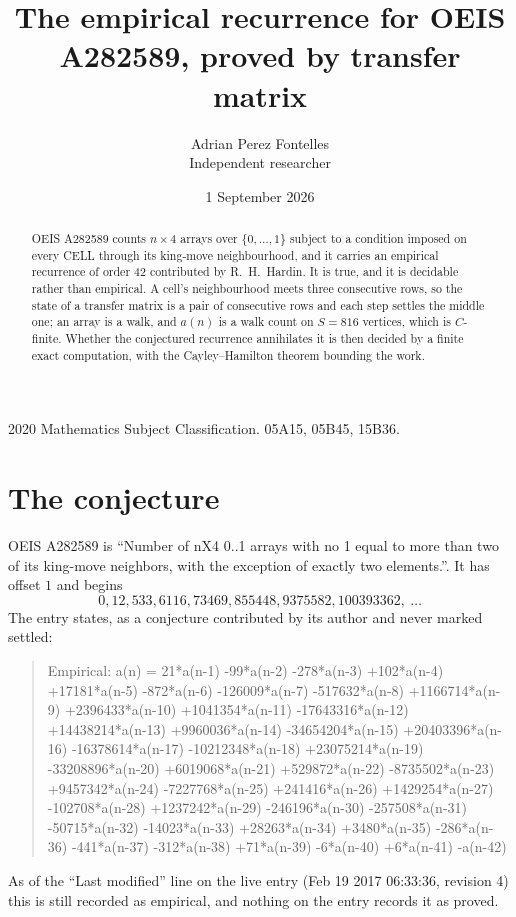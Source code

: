 \documentclass[11pt,a4paper]{article}
\title{The empirical recurrence for OEIS A282589, proved by transfer matrix}
\author{Adrian Perez Fontelles\\ \small Independent researcher}
\date{1 September 2026}
\theoremstyle{plain}
\theoremstyle{definition}
\begin{document}
\maketitle

\begin{abstract}
OEIS A282589 counts $n\times4$ arrays over $\{0,\dots,1\}$ subject to a condition imposed on
every CELL through its king-move neighbourhood, and it carries an empirical recurrence of
order $42$ contributed by R.~H.~Hardin. It is true, and it is decidable rather than
empirical. A cell's neighbourhood meets three consecutive rows, so the state of a transfer
matrix is a pair of consecutive rows and each step settles the middle one; an array is a
walk, and $a(n)$ is a walk count on $S=816$ vertices, which is $C$-finite. Whether the
conjectured recurrence annihilates it is then decided by a finite exact computation, with the
Cayley--Hamilton theorem bounding the work.
\end{abstract}

\noindent\small 2020 Mathematics Subject Classification. 05A15, 05B45, 15B36.\normalsize

\section{The conjecture}

OEIS A282589 is ``Number of nX4 0..1 arrays with no 1 equal to more than two of its king-move neighbors, with the exception of exactly two elements.''. It has offset $1$ and begins
\[
0, 12, 533, 6116, 73469, 855448, 9375582, 100393362,\ \dots
\]
The entry states, as a conjecture contributed by its author and never marked settled:
\begin{quote}
Empirical: a(n) = 21*a(n-1) -99*a(n-2) -278*a(n-3) +102*a(n-4) +17181*a(n-5) -872*a(n-6) -126009*a(n-7) -517632*a(n-8) +1166714*a(n-9) +2396433*a(n-10) +1041354*a(n-11) -17643316*a(n-12) +14438214*a(n-13) +9960036*a(n-14) -34654204*a(n-15) +20403396*a(n-16) -16378614*a(n-17) -10212348*a(n-18) +23075214*a(n-19) -33208896*a(n-20) +6019068*a(n-21) +529872*a(n-22) -8735502*a(n-23) +9457342*a(n-24) -7227768*a(n-25) +241416*a(n-26) +1429254*a(n-27) -102708*a(n-28) +1237242*a(n-29) -246196*a(n-30) -257508*a(n-31) -50715*a(n-32) -14023*a(n-33) +28263*a(n-34) +3480*a(n-35) -286*a(n-36) -441*a(n-37) -312*a(n-38) +71*a(n-39) -6*a(n-40) +6*a(n-41) -a(n-42)
\end{quote}
As of the ``Last modified'' line on the live entry (Feb 19 2017 06:33:36, revision 4) this is still
recorded as empirical, and nothing on the entry records it as proved.
\end{document}
